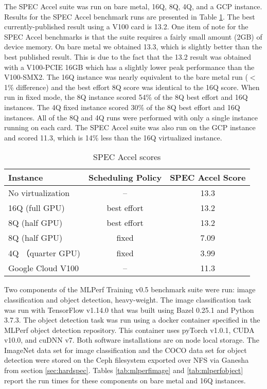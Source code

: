 \documentclass[conference]{IEEEtran}
\begin{document}
The SPEC Accel suite was run on bare metal, 16Q, 8Q, 4Q, and a GCP instance. Results for the SPEC Accel benchmark runs are presented in Table \ref{tab:specaccel}. The best currently-published result using a V100 card is 13.2. One item of note for the SPEC Accel benchmarks is that the suite requires a fairly small amount (2GB) of device memory. On bare metal we obtained 13.3, which is slightly better than the best published result. This is due to the fact that the 13.2 result was obtained with a V100-PCIE 16GB which has a slightly lower peak performance than the V100-SMX2. The 16Q instance was nearly equivalent to the bare metal run ($<$ 1\% difference) and the best effort 8Q score was identical to the 16Q score. When run in fixed mode, the 8Q instance scored 54\% of the 8Q best effort and 16Q instances. The 4Q fixed instance scored 30\% of the 8Q best effort and 16Q instances. All of the 8Q and 4Q runs were performed with only a single instance running on each card. The SPEC Accel suite was also run on the GCP instance and scored 11.3, which is 14\% less than the 16Q virtualized instance. 
 
\begin{table}[t]
\centering
\caption{SPEC Accel scores}
\label{tab:specaccel}

\begin{tabular}{lcc}
\toprule
\textbf{Instance} & \textbf{Scheduling Policy} & \textbf{SPEC Accel Score} \\
\midrule
No virtualization & -- & 13.3 \\
16Q (full GPU) & best effort & 13.2 \\
8Q (half GPU) & best effort & 13.2\\
8Q (half GPU) & fixed & 7.09 \\
4Q （quarter GPU) & fixed & 3.99 \\
Google Cloud V100 & -- & 11.3 \\

\bottomrule
\end{tabular}

\end{table}
Two components of the MLPerf Training v0.5 benchmark suite were run: image classification and object detection, heavy-weight. The image classification task was run with TensorFlow v1.14.0 that was built using Bazel 0.25.1 and Python 3.7.3. The object detection task was run using a docker container specified in the MLPerf object detection repository. This container uses pyTorch v1.0.1, CUDA v10.0, and cuDNN v7. Both software installations are on node local storage. The ImageNet data set for image classification and the COCO data set for object detection were stored on the Ceph filesystem exported over NFS via Ganesha from section \ref{sec:hardspec}. Tables \ref{tab:mlperfimage} and \ref{tab:mlperfobject} report the run times for these components on bare metal and 16Q instances. 
\end{document}
